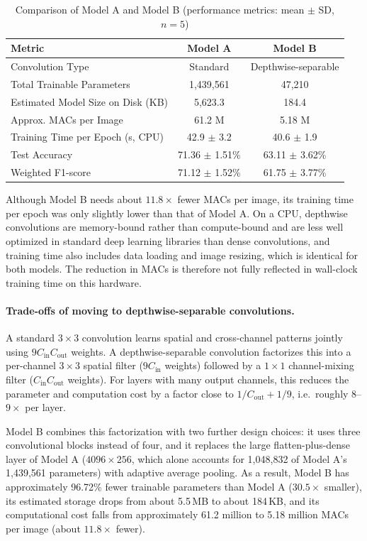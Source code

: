 \documentclass[12pt,a4paper]{article}
\begin{document}
\begin{table}[H]
\centering
\caption{Comparison of Model A and Model B (performance metrics: mean $\pm$ SD, $n=5$)}
\label{tab:model_ab_comparison}
\begin{tabular}{lcc}
\hline
\textbf{Metric} & \textbf{Model A} & \textbf{Model B} \\
\hline
Convolution Type & Standard & Depthwise-separable \\
Total Trainable Parameters & 1,439,561 & 47,210 \\
Estimated Model Size on Disk (KB) & 5,623.3 & 184.4 \\
Approx. MACs per Image & 61.2 M & 5.18 M \\
Training Time per Epoch (s, CPU) & 42.9 $\pm$ 3.2 & 40.6 $\pm$ 1.9 \\
Test Accuracy & 71.36 $\pm$ 1.51\% & 63.11 $\pm$ 3.62\% \\
Weighted F1-score & 71.12 $\pm$ 1.52\% & 61.75 $\pm$ 3.77\% \\
\hline
\end{tabular}
\end{table}

Although Model B needs about $11.8\times$ fewer MACs per image, its
training time per epoch was only slightly lower than that of Model A.
On a CPU, depthwise convolutions are memory-bound rather than
compute-bound and are less well optimized in standard deep learning
libraries than dense convolutions, and training time also includes data
loading and image resizing, which is identical for both models. The
reduction in MACs is therefore not fully reflected in wall-clock training
time on this hardware.

\paragraph{Trade-offs of moving to depthwise-separable convolutions.}
A standard $3\times3$ convolution learns spatial and cross-channel
patterns jointly using $9C_{\mathrm{in}}C_{\mathrm{out}}$ weights. A
depthwise-separable convolution factorizes this into a per-channel
$3\times3$ spatial filter ($9C_{\mathrm{in}}$ weights) followed by a
$1\times1$ channel-mixing filter ($C_{\mathrm{in}}C_{\mathrm{out}}$
weights). For layers with many output channels, this reduces the
parameter and computation cost by a factor close to
$1/C_{\mathrm{out}} + 1/9$, i.e.\ roughly $8$--$9\times$ per layer.

Model B combines this factorization with two further design choices:
it uses three convolutional blocks instead of four, and it replaces the
large flatten-plus-dense layer of Model A ($4096\times256$, which alone
accounts for 1,048,832 of Model A's 1,439,561 parameters) with adaptive
average pooling. As a result, Model B has approximately 96.72\% fewer
trainable parameters than Model A ($30.5\times$ smaller), its estimated
storage drops from about 5.5\,MB to about 184\,KB, and its computational
cost falls from approximately 61.2 million to 5.18 million MACs per image
(about $11.8\times$ fewer).
\end{document}
